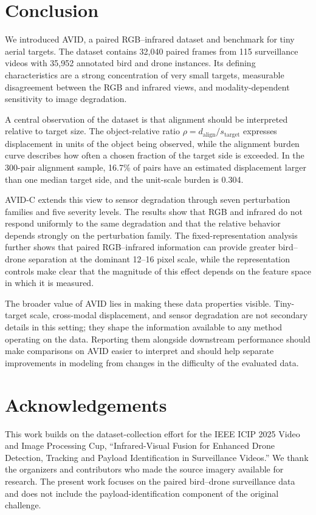 \documentclass[10pt]{article}
\newcommand{\dataset}{\textsc{AVID}}
\newcommand{\corrupt}{\textsc{AVID-C}}
\begin{document}
\section{Conclusion}

We introduced \dataset{}, a paired RGB--infrared dataset and benchmark for tiny aerial targets. The dataset contains 32,040 paired frames from 115 surveillance videos with 35,952 annotated bird and drone instances. Its defining characteristics are a strong concentration of very small targets, measurable disagreement between the RGB and infrared views, and modality-dependent sensitivity to image degradation.

A central observation of the dataset is that alignment should be interpreted relative to target size. The object-relative ratio
$\rho=d_{\mathrm{align}}/s_{\mathrm{target}}$
expresses displacement in units of the object being observed, while the alignment burden curve describes how often a chosen fraction of the target side is exceeded. In the 300-pair alignment sample, 16.7\% of pairs have an estimated displacement larger than one median target side, and the unit-scale burden is 0.304.

\corrupt{} extends this view to sensor degradation through seven perturbation families and five severity levels. The results show that RGB and infrared do not respond uniformly to the same degradation and that the relative behavior depends strongly on the perturbation family. The fixed-representation analysis further shows that paired RGB--infrared information can provide greater bird--drone separation at the dominant 12--16 pixel scale, while the representation controls make clear that the magnitude of this effect depends on the feature space in which it is measured.

The broader value of \dataset{} lies in making these data properties visible. Tiny-target scale, cross-modal displacement, and sensor degradation are not secondary details in this setting; they shape the information available to any method operating on the data. Reporting them alongside downstream performance should make comparisons on \dataset{} easier to interpret and should help separate improvements in modeling from changes in the difficulty of the evaluated data.


\section*{Acknowledgements}

This work builds on the dataset-collection effort for the IEEE ICIP 2025 Video and Image Processing Cup, ``Infrared-Visual Fusion for Enhanced Drone Detection, Tracking and Payload Identification in Surveillance Videos.'' We thank the organizers and contributors who made the source imagery available for research. The present work focuses on the paired bird--drone surveillance data and does not include the payload-identification component of the original challenge.
\end{document}

